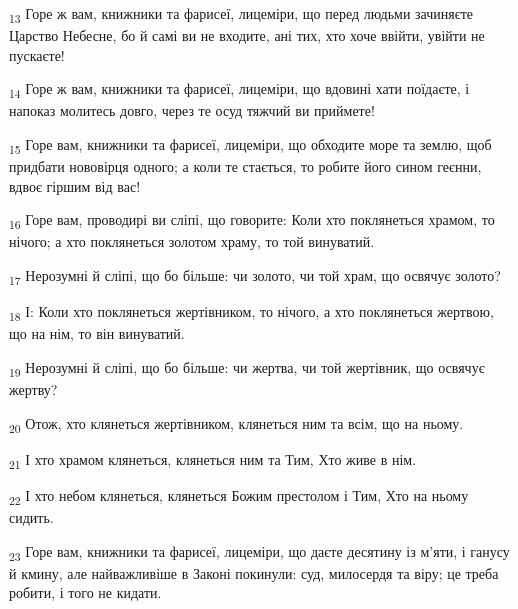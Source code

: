 \begin{tcolorbox}
\textsubscript{13} Горе ж вам, книжники та фарисеї, лицеміри, що перед людьми зачиняєте Царство Небесне, бо й самі ви не входите, ані тих, хто хоче ввійти, увійти не пускаєте!
\end{tcolorbox}
\begin{tcolorbox}
\textsubscript{14} Горе ж вам, книжники та фарисеї, лицеміри, що вдовині хати поїдаєте, і напоказ молитесь довго, через те осуд тяжчий ви приймете!
\end{tcolorbox}
\begin{tcolorbox}
\textsubscript{15} Горе вам, книжники та фарисеї, лицеміри, що обходите море та землю, щоб придбати нововірця одного; а коли те стається, то робите його сином геєнни, вдвоє гіршим від вас!
\end{tcolorbox}
\begin{tcolorbox}
\textsubscript{16} Горе вам, проводирі ви сліпі, що говорите: Коли хто поклянеться храмом, то нічого; а хто поклянеться золотом храму, то той винуватий.
\end{tcolorbox}
\begin{tcolorbox}
\textsubscript{17} Нерозумні й сліпі, що бо більше: чи золото, чи той храм, що освячує золото?
\end{tcolorbox}
\begin{tcolorbox}
\textsubscript{18} І: Коли хто поклянеться жертівником, то нічого, а хто поклянеться жертвою, що на нім, то він винуватий.
\end{tcolorbox}
\begin{tcolorbox}
\textsubscript{19} Нерозумні й сліпі, що бо більше: чи жертва, чи той жертівник, що освячує жертву?
\end{tcolorbox}
\begin{tcolorbox}
\textsubscript{20} Отож, хто клянеться жертівником, клянеться ним та всім, що на ньому.
\end{tcolorbox}
\begin{tcolorbox}
\textsubscript{21} І хто храмом клянеться, клянеться ним та Тим, Хто живе в нім.
\end{tcolorbox}
\begin{tcolorbox}
\textsubscript{22} І хто небом клянеться, клянеться Божим престолом і Тим, Хто на ньому сидить.
\end{tcolorbox}
\begin{tcolorbox}
\textsubscript{23} Горе вам, книжники та фарисеї, лицеміри, що даєте десятину із м'яти, і ганусу й кмину, але найважливіше в Законі покинули: суд, милосердя та віру; це треба робити, і того не кидати.
\end{tcolorbox}

